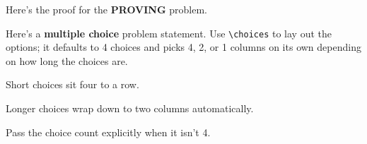 \documentclass[a4paper, 10pt]{article}
\begin{document}
\begin{proofbox}
	Here's the proof for the \textbf{PROVING} problem.
\end{proofbox}

\begin{problem}
Here's a \textbf{multiple choice} problem statement. Use \verb|\choices| to lay
out the options; it defaults to 4 choices and picks 4, 2, or 1 columns on its
own depending on how long the choices are.
\begin{subproblems}
	\item Short choices sit four to a row.
	\item Longer choices wrap down to two columns automatically.
	\item Pass the choice count explicitly when it isn't 4.
\end{subproblems}
\end{problem}
\end{document}
